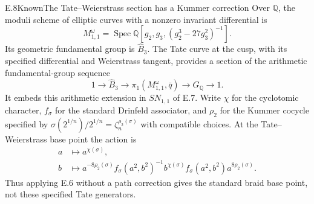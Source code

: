 \begin{statement}{E.8}{Known}{The Tate--Weierstrass section has a Kummer correction}
Over $\mathbb Q$, the moduli scheme of elliptic curves with a nonzero
invariant differential is
\[
 M_{1,1}^{\omega}=\operatorname{Spec}
 \mathbb Q[g_2,g_3,(g_2^3-27g_3^2)^{-1}].
\]
Its geometric fundamental group is $\widehat B_3$.  The Tate curve
at the cusp, with its specified differential and Weierstrass tangent,
provides a section of the arithmetic fundamental-group sequence
\[
 1\to\widehat B_3\to\pi_1(M_{1,1}^{\omega},\bar q)
       \to G_{\mathbb Q}\to1.
\]
It embeds this arithmetic extension in $SN_{1,1}$ of E.7.  Write
$\chi$ for the cyclotomic character, $f_\sigma$ for the standard
Drinfeld associator, and $\rho_2$ for the Kummer cocycle specified by
$\sigma(2^{1/n})/2^{1/n}=\zeta_n^{\rho_2(\sigma)}$ with compatible
choices.  At the Tate--Weierstrass base point the action is
\begin{align*}
 a&\longmapsto a^{\chi(\sigma)},\\
 b&\longmapsto a^{-8\rho_2(\sigma)}
 f_\sigma(a^2,b^2)^{-1}b^{\chi(\sigma)}f_\sigma(a^2,b^2)
 a^{8\rho_2(\sigma)}.
\end{align*}
Thus applying E.6 without a path correction gives the standard braid
base point, not these specified Tate generators.
\end{statement}
